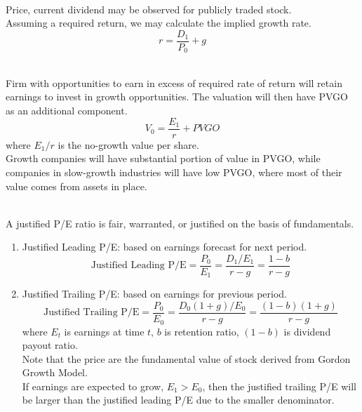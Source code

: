 \begin{remark} \\
Price, current dividend may be observed for publicly traded stock.\\
Assuming a required return, we may calculate the implied growth rate. 
\begin{equation}
r = \frac{D_1}{P_0} + g \nonumber
\end{equation}
\end{remark}

\begin{remark} \\
Firm with opportunities to earn in excess of required rate of return will retain earnings to invest in growth opportunities. The valuation will then have PVGO as an additional component.
\begin{equation}
V_0 = \frac{E_1}{r} + PVGO \nonumber
\end{equation}
where $E_1/r$ is the no-growth value per share.\\
Growth companies will have substantial portion of value in PVGO, while companies in slow-growth industries will have low PVGO, where most of their value comes from assets in place.
\end{remark}

\begin{remark} \\
A justified P/E ratio is fair, warranted, or justified on the basis of fundamentals.
\begin{enumerate}[label=\roman*.]
\setlength{\itemsep}{0pt}
\item Justified Leading P/E: based on earnings forecast for next period.
\begin{equation}
\text{Justified Leading P/E} = \frac{P_0}{E_1} = \frac{D_1/E_1}{r-g} = \frac{1-b}{r-g} \nonumber
\end{equation}
\item Justified Trailing P/E: based on earnings for previous period.
\begin{equation}
\text{Justified Trailing P/E} = \frac{P_0}{E_0} = \frac{D_0(1+g)/E_0}{r-g} = \frac{(1-b)(1+g)}{r-g} \nonumber
\end{equation}
where $E_t$ is earnings at time $t$, $b$ is retention ratio, $(1-b)$ is dividend payout ratio.\\
Note that the price are the fundamental value of stock derived from Gordon Growth Model.\\
If earnings are expected to grow, $E_1 > E_0$, then the justified trailing P/E will be larger than the justified leading P/E due to the smaller denominator.
\end{enumerate}
\end{remark}

